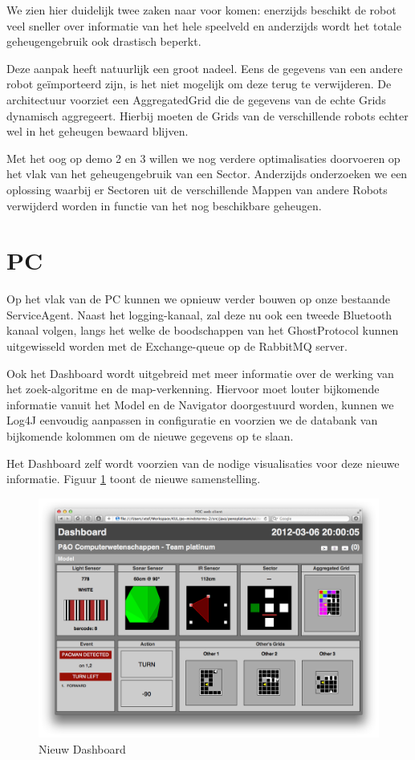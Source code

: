\documentclass[12pt,a4paper]{report}
\begin{document}
We zien hier duidelijk twee zaken naar voor komen: enerzijds beschikt de robot veel sneller over informatie van het hele speelveld en anderzijds wordt het totale geheugengebruik ook drastisch beperkt.

Deze aanpak heeft natuurlijk een groot nadeel. Eens de gegevens van een andere robot ge\"importeerd zijn, is het niet mogelijk om deze terug te verwijderen. De architectuur voorziet een AggregatedGrid die de gegevens van de echte Grids dynamisch aggregeert. Hierbij moeten de Grids  van de verschillende robots echter wel in het geheugen bewaard blijven.

Met het oog op demo 2 en 3 willen we nog verdere optimalisaties doorvoeren op het vlak van het geheugengebruik van een Sector. Anderzijds onderzoeken we een oplossing waarbij er Sectoren uit de verschillende Mappen van andere Robots verwijderd worden in functie van het nog beschikbare geheugen.

\section{PC}

Op het vlak van de PC kunnen we opnieuw verder bouwen op onze bestaande ServiceAgent. Naast het logging-kanaal, zal deze nu ook een tweede Bluetooth kanaal volgen, langs het welke de boodschappen van het GhostProtocol kunnen uitgewisseld worden met de Exchange-queue op de RabbitMQ server.

Ook het Dashboard wordt uitgebreid met meer informatie over de werking van het zoek-algoritme en de map-verkenning. Hiervoor moet louter bijkomende informatie vanuit het Model en de Navigator doorgestuurd worden, kunnen we Log4J eenvoudig aanpassen in configuratie en voorzien we de databank van bijkomende kolommen om de nieuwe gegevens op te slaan.

Het Dashboard zelf wordt voorzien van de nodige visualisaties voor deze nieuwe informatie. Figuur \ref{fig:dashboard} toont de nieuwe samenstelling.

\begin{figure}[htbp]
  \centering
  \includegraphics[width=155mm]{resources/dashboard.png}
  \caption{Nieuw Dashboard}
  \label{fig:dashboard}
\end{figure}
\end{document}
